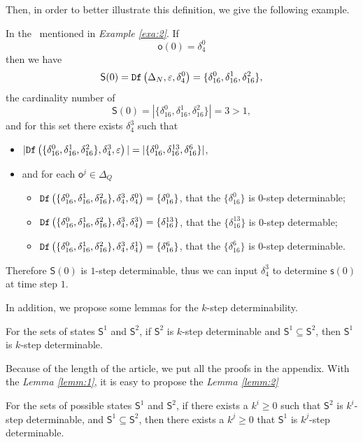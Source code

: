  Then, in order to better illustrate this definition, we give the following example.
\begin{example}
In the \BCN\ mentioned in {\em Example \ref{exa:2}}. If \[\mathsf{o}(0)=\delta_4^0\] then we have \[\mathsf{S}(0)={\tt Df}\left(\Delta_N,\varepsilon,\delta_4^0\right)=\{\delta_{16}^0,\delta_{16}^1,\delta_{16}^2\},\] the cardinality number of \[\mathsf{S}(0)=|\{\delta_{16}^0,\delta_{16}^1,\delta_{16}^2\}|=3>1,\] and for this set there exists $\delta_{4}^3$ such that 
 \begin{itemize}
 \item  $|{\tt Df}\left(\{\delta_{16}^0,\delta_{16}^1,\delta_{16}^2\},\delta_{4}^3,\varepsilon\right)|=|\{\delta_{16}^0,\delta_{16}^{13},\delta_{16}^6\}|$,
 \item   and for each $\mathsf{o}^{j}\in \Delta_Q$
  \begin{itemize}
  \item   ${\tt Df}\left(\{\delta_{16}^0,\delta_{16}^1,\delta_{16}^2\},\delta_{4}^3,\delta_{4}^0\right)=\{\delta_{16}^0\}$, that the $\{\delta_{16}^0\}$ is $0$-step determinable;
 \item  ${\tt Df}\left(\{\delta_{16}^0,\delta_{16}^1,\delta_{16}^2\},\delta_{4}^3,\delta_{4}^3\right)=\{\delta_{16}^{13}\}$, that the $\{\delta_{16}^{13}\}$ is $0$-step determable;
  \item  ${\tt Df}\left(\{\delta_{16}^0,\delta_{16}^1,\delta_{16}^2\},\delta_{4}^3,\delta_{4}^1\right)=\{\delta_{16}^{6}\}$, that the $\{\delta_{16}^{6}\}$ is $0$-step determinable.
 \end{itemize}
 \end{itemize}
 Therefore $\mathsf{S}(0)$ is $1$-step determinable, thus we can  input $\delta_{4}^3$ to determine $\mathsf{s}(0)$ at time step $1$.
\label{exa:9}
\end{example}  

In addition, we propose some lemmas for the $k$-step determinability.

\begin{lemma}
For the sets of states $\mathsf{S}^{1}$ and $\mathsf{S}^{2}$, if $\mathsf{S}^{2}$ is $k$-step determinable and $\mathsf{S}^{1}\subseteq \mathsf{S}^{2}$, then $\mathsf{S}^{1}$ is $k$-step determinable.
  \label{lemm:1}
\end{lemma}

Because of the length of the article, we put all the proofs in the appendix. With the {\em Lemma \ref{lemm:1}}, it is easy to propose the {\em Lemma \ref{lemm:2}}
\begin{lemma}
For the sets of possible states $\mathsf{S}^{1}$ and $\mathsf{S}^{2}$, if there exists a $k^{i}\ge 0$ such that $\mathsf{S}^{2}$ is $k^{i}$-step determinable, and $\mathsf{S}^{1}\subseteq \mathsf{S}^{2}$, then there exists a $k^{j}\ge 0$ that $\mathsf{S}^{1}$ is $k^{j}$-step determinable.
\label{lemm:2}
\end{lemma}

